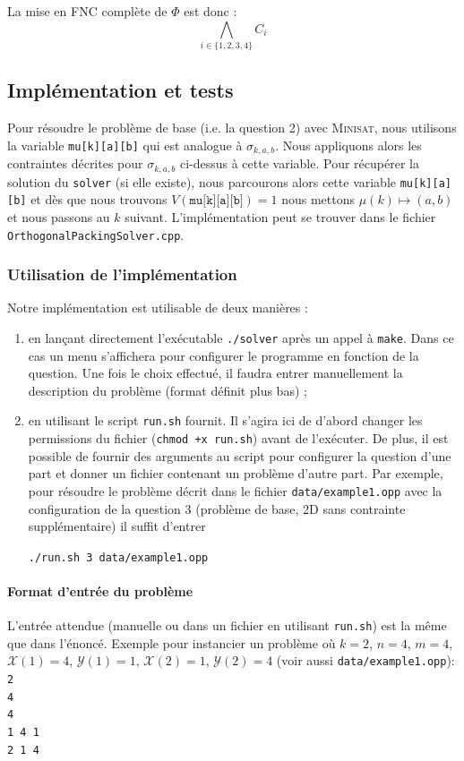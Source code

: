 \documentclass[a4paper]{article}
\begin{document}
La mise en FNC complète de $\Phi$ est donc :
\begin{equation*}
 \bigwedge\limits_{i \in \{1, 2, 3, 4\}} C_i
\end{equation*}

\subsection{Implémentation et tests}
Pour résoudre le problème de base (i.e. la question 2) avec \textsc{Minisat}, nous utilisons la variable \texttt{mu[k][a][b]} qui est analogue à $\sigma_{k,a,b}$. Nous appliquons alors les contraintes décrites pour $\sigma_{k,a,b}$ ci-dessus à cette variable. Pour récupérer la solution du \texttt{solver} (si elle existe), nous parcourons alors cette variable \texttt{mu[k][a][b]} et dès que nous trouvons $V(\texttt{mu[k][a][b]}) = 1$ nous mettons $\mu(k) \mapsto (a,b)$ et nous passons au $k$ suivant. L'implémentation peut se trouver dans le fichier \texttt{OrthogonalPackingSolver.cpp}.
\subsubsection{Utilisation de l'implémentation}
Notre implémentation est utilisable de deux manières :
\begin{enumerate}
	\item en lançant directement l'exécutable \texttt{./solver} après un appel à \texttt{make}. Dans ce cas un menu s'affichera pour configurer le programme en fonction de la question. Une fois le choix effectué, il faudra entrer manuellement la description du problème (format définit plus bas) ;
	\item en utilisant le script \texttt{run.sh} fournit. Il s'agira ici de d'abord changer les permissions du fichier (\texttt{chmod +x run.sh}) avant de l'exécuter. De plus, il est possible de fournir des arguments au script pour configurer la question d'une part et donner un fichier contenant un problème d'autre part. Par exemple, pour résoudre le problème décrit dans le fichier \texttt{data/example1.opp} avec la configuration de la question 3 (problème de base, 2D sans contrainte supplémentaire) il suffit d'entrer 
\begin{center}
\texttt{./run.sh 3 data/example1.opp}
\end{center}
\end{enumerate}

\paragraph{Format d'entrée du problème}
L'entrée attendue (manuelle ou dans un fichier en utilisant \texttt{run.sh}) est la même que dans l'énoncé. Exemple pour instancier un problème où $k=2$, $n=4$, $m=4$, $\mathcal{X}(1) = 4$, $\mathcal{Y}(1) = 1$, $\mathcal{X}(2) = 1$, $\mathcal{Y}(2) = 4$ (voir aussi \texttt{data/example1.opp}):
\texttt{\\2\\4\\4\\1 4 1\\2 1 4}
\end{document}
